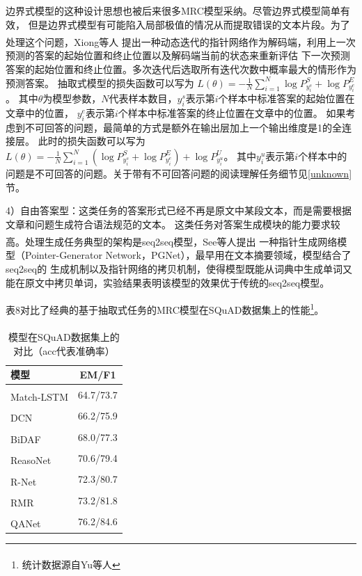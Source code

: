 \documentclass{article}
\newcommand{\upcite}[1]{\textsuperscript{\textsuperscript{\cite{#1}}}}
\begin{document}
边界式模型的这种设计思想也被后来很多MRC模型采纳。尽管边界式模型简单有效，
但是边界式模型有可能陷入局部极值的情况从而提取错误的文本片段。为了处理这个问题，Xiong等人\upcite{DCN}
提出一种动态迭代的指针网络作为解码端，利用上一次预测的答案的起始位置和终止位置以及解码端当前的状态来重新评估
下一次预测答案的起始位置和终止位置。多次迭代后选取所有迭代次数中概率最大的情形作为预测答案。
抽取式模型的损失函数可以写为
$L(\theta)=-\displaystyle\frac{1}{N}\sum_{i=1}^{N}\log P_{y_i^s}^S+\log P_{y_i^e}^E$。
其中$\theta$为模型参数，$N$代表样本数目，$y_i^s$表示第$i$个样本中标准答案的起始位置在文章中的位置，
$y_i^e$表示第$i$个样本中标准答案的终止位置在文章中的位置。
如果考虑到不可回答的问题，最简单的方式是额外在输出层加上一个输出维度是1的全连接层。
此时的损失函数可以写为
$L(\theta)=-\displaystyle\frac{1}{N}\sum_{i=1}^{N}(\log P_{y_i^s}^S+\log P_{y_i^e}^E)+\log P_{y_i^u}^U$。
其中$y_i^u$表示第$i$个样本中的问题是不可回答的问题。关于带有不可回答问题的阅读理解任务细节见\ref{unknown}节。

4）自由答案型：这类任务的答案形式已经不再是原文中某段文本，而是需要根据文章和问题生成符合语法规范的文本。
这类任务对答案生成模块的能力要求较高。处理生成任务典型的架构是seq2seq模型，See等人\upcite{PGNet}提出
一种指针生成网络模型（Pointer-Generator Network，PGNet），最早用在文本摘要领域，模型结合了seq2seq的
生成机制以及指针网络的拷贝机制，使得模型既能从词典中生成单词又能在原文中拷贝单词，实验结果表明该模型的效果优于传统的seq2seq模型。

表8对比了经典的基于抽取式任务的MRC模型在SQuAD\upcite{SQuAD1}数据集上的性能\footnote{统计数据源自Yu等人\upcite{QANet}}。


\begin{table}[ht]
	\centering
	\caption{模型在SQuAD\upcite{SQuAD1}数据集上的对比（acc代表准确率）}
	\begin{tabular}{l c}
		\toprule
		模型&EM/F1\\
		\midrule
		Match-LSTM\upcite{MatchLSTM}& 64.7/73.7\\
		\midrule
		DCN\upcite{DCN}& 66.2/75.9\\
		\midrule
		BiDAF\upcite{BiDAF}&68.0/77.3\\
		\midrule
		ReasoNet\upcite{Reasonet}&70.6/79.4\\
		\midrule
		R-Net\upcite{RNet}&72.3/80.7 \\
		\midrule
		RMR\upcite{RMR}&73.2/81.8 \\
		\midrule
		QANet\upcite{QANet}& 76.2/84.6\\
		\bottomrule
	\end{tabular}
\end{table}
\end{document}
